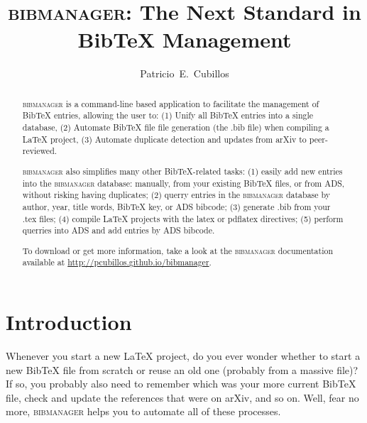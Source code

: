 





\title{\textsc{bibmanager}: The Next Standard in BibTeX Management}

\author{Patricio~E.~Cubillos}


\begin{abstract}

  \textsc{bibmanager} is a command-line based application to
  facilitate the management of BibTeX entries, allowing the user to:
  (1) Unify all BibTeX entries into a single database, (2) Automate
  BibTeX file file generation (the .bib file) when compiling a LaTeX
  project, (3) Automate duplicate detection and updates from arXiv to
  peer-reviewed.

  \textsc{bibmanager} also simplifies many other BibTeX-related tasks:
  (1) easily add new entries into the \textsc{bibmanager} database: manually,
  from your existing BibTeX files, or from ADS, without risking having
  duplicates; (2) querry entries in the \textsc{bibmanager} database by author,
  year, title words, BibTeX key, or ADS bibcode; (3) generate .bib
  from your .tex files; (4) compile LaTeX projects with the latex or
  pdflatex directives; (5) perform querries into ADS and add entries
  by ADS bibcode.

  To download or get more information, take a look at the \textsc{bibmanager}
  documentation available at \href{http://pcubillos.github.io/bibmanager}
  {http://pcubillos.github.io/bibmanager}.
\end{abstract}



\section{Introduction}
\label{introduction}

Whenever you start a new LaTeX project, do you ever wonder whether to
start a new BibTeX file from scratch or reuse an old one (probably
from a massive file)? If so, you probably also need to remember which
was your more current BibTeX file, check and update the references
that were on arXiv, and so on.  Well, fear no more,
\textsc{bibmanager} helps you to automate all of these processes.

